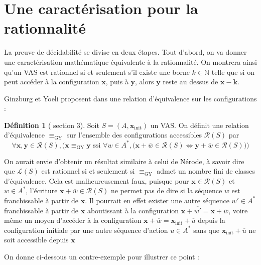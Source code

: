 \documentclass[a4paper,final]{article}
\theoremstyle{definition}
\newtheorem{Definition}[Theorem]{Définition}
\newcommand{\N}{\ensuremath{\mathbb{N}}}
\newcommand{\lang}{\ensuremath{\mathcal{L}}}
\newcommand{\conf}{\ensuremath{\mathcal{R}}}
\newcommand{\vect}[1]{\ensuremath{\mathbf{#1}}}
\newcommand{\relGY}{\ensuremath{\equiv_\text{GY}}}
\newcommand{\ssi}{\ensuremath{\text{ ssi }}}
\newcommand{\equivaut}{\ensuremath{\Leftrightarrow}}
\newcommand{\xinit}{\ensuremath{\vect{x}_\text{init}}}
\newcommand{\valeur}[1]{\ensuremath{\overline{#1}}}
\begin{document}

\section{Une caractérisation pour la rationnalité}

La preuve de décidabilité se divise en deux étapes.
Tout d'abord, on va donner une caractérisation mathématique équivalente à la rationnalité.
On montrera ainsi qu'un VAS est rationnel si et seulement s'il existe une borne $k\in\N$ telle que si on peut accéder à la configuration $\vect{x}$, puis à $\vect{y}$, alors $\vect{y}$ reste au dessus de $\vect{x}-\vect{k}$.

Ginzburg et Yoeli proposent dans \cite{giyo80} une relation d'équivalence sur les configurations :

\begin{Definition}[\cite{giyo80} section 3]
Soit $S=(A,\xinit)$ un VAS. On définit une relation d'équivalence $\relGY$ sur l'ensemble des configurations accessibles $\conf(S)$ par
$$\forall \vect{x},\vect{y}\in\conf(S), \Big(
\vect{x}\relGY\vect{y} \ssi \forall w\in A^\ast, \big( \vect{x} +\valeur{w}\in\conf(S) \equivaut \vect{y} +\valeur{w}\in\conf(S) \big) \Big)$$
\end{Definition}

On aurait envie d'obtenir un résultat similaire à celui de Nérode, à savoir dire que $\lang(S)$ est rationnel si et seulement si $\relGY$ admet un nombre fini de classes d'équivalence.
Cela est malheureusement faux, puisque pour $\vect{x}\in\conf(S)$ et $w\in A^\ast$, l'écriture $\vect{x} +\valeur{w}\in\conf(S)$ ne permet pas de dire si la séquence $w$ est franchissable à partir de $\vect{x}$.
Il pourrait en effet exister une autre séquence $w'\in A^\ast$ franchissable à partir de $\vect{x}$ aboutissant à la configuration $\vect{x} +\valeur{w'} = \vect{x} +\valeur{w}$,
voire même un moyen d'accéder à la configuration $\vect{x} +\valeur{w} = \xinit +\valeur{u}$ depuis la configuration initiale par une autre séquence d'action $u\in A^\ast$ sans que $\xinit +\valeur{u}$ ne soit accessible depuis $\vect{x}$

On donne ci-dessous un contre-exemple pour illustrer ce point :
\end{document}
